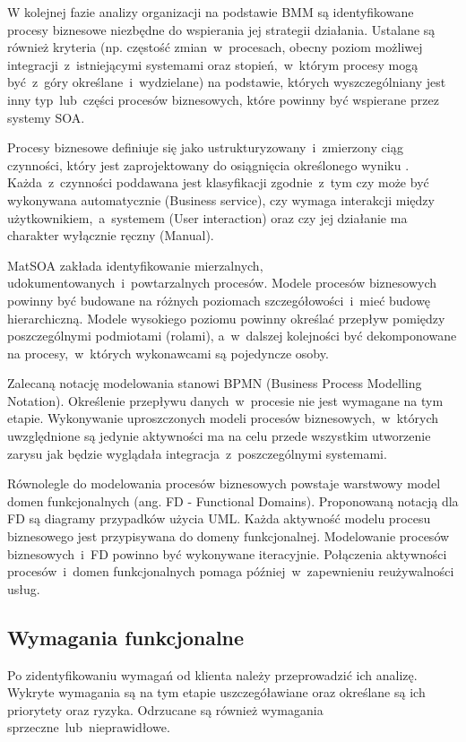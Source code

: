 W kolejnej fazie analizy organizacji na podstawie BMM są identyfikowane procesy biznesowe niezbędne do wspierania jej strategii działania. Ustalane są również kryteria (np. częstość zmian~w~procesach, obecny poziom możliwej integracji~z~istniejącymi systemami oraz stopień,~w~którym procesy mogą być~z~góry określane~i~wydzielane) na podstawie, których wyszczególniany jest inny typ~lub~części procesów biznesowych, które powinny być wspierane przez systemy SOA.

Procesy biznesowe definiuje się jako ustrukturyzowany~i~zmierzony ciąg czynności, który jest zaprojektowany do osiągnięcia określonego wyniku \cite{PlatIntGor}. Każda~z~czynności poddawana jest klasyfikacji zgodnie~z~tym czy może być wykonywana automatycznie (Business service), czy wymaga interakcji między użytkownikiem,~a~systemem (User interaction) oraz czy jej działanie ma charakter wyłącznie ręczny (Manual).

MatSOA zakłada identyfikowanie mierzalnych, udokumentowanych~i~powtarzalnych procesów. Modele procesów biznesowych powinny być budowane na różnych poziomach szczegółowości~i~mieć budowę hierarchiczną. Modele wysokiego poziomu powinny określać przepływ pomiędzy poszczególnymi podmiotami (rolami), a~w~dalszej kolejności być dekomponowane na procesy,~w~których wykonawcami są pojedyncze osoby. 

Zalecaną notację modelowania stanowi BPMN (Business Process Modelling Notation). Określenie przepływu danych~w~procesie nie jest wymagane na tym etapie. Wykonywanie uproszczonych modeli procesów biznesowych,~w~których uwzględnione są jedynie aktywności ma na celu przede wszystkim utworzenie zarysu jak będzie wyglądała integracja~z~poszczególnymi systemami.

Równolegle do modelowania procesów biznesowych powstaje warstwowy model domen funkcjonalnych (ang. FD - Functional Domains). Proponowaną notacją dla FD są diagramy przypadków użycia UML. Każda aktywność modelu procesu biznesowego jest przypisywana do domeny funkcjonalnej. Modelowanie procesów biznesowych~i~FD powinno być wykonywane iteracyjnie. Połączenia aktywności procesów~i~domen funkcjonalnych pomaga później~w~zapewnieniu reużywalności usług.

\subsection*{Wymagania funkcjonalne}
Po zidentyfikowaniu wymagań od klienta należy przeprowadzić ich analizę. Wykryte wymagania są na tym etapie uszczegóławiane oraz określane są ich priorytety oraz ryzyka. Odrzucane są również wymagania sprzeczne~lub~nieprawidłowe.


